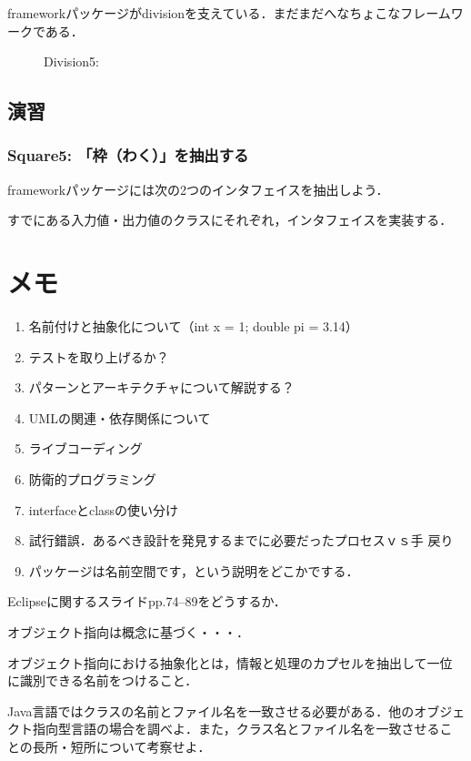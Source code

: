 \documentclass[a4j, twoside]{jsbook}
\begin{document}
frameworkパッケージがdivisionを支えている．まだまだへなちょこなフレームワークである．

\begin{figure}
 
 \caption{Division5: }
\end{figure}

\section{演習}
\subsection{Square5: 「枠（わく）」を抽出する}

frameworkパッケージには次の2つのインタフェイスを抽出しよう．




すでにある入力値・出力値のクラスにそれぞれ，インタフェイスを実装する．




\newpage

\newpage


\chapter{メモ}

\begin{enumerate}
 \item 名前付けと抽象化について（int x = 1; double pi = 3.14）
 \item テストを取り上げるか？
 \item パターンとアーキテクチャについて解説する？
 \item UMLの関連・依存関係について
 \item ライブコーディング
 \item 防衛的プログラミング
 \item interfaceとclassの使い分け
 \item 試行錯誤．あるべき設計を発見するまでに必要だったプロセスｖｓ手
       戻り
 \item パッケージは名前空間です，という説明をどこかでする．
\end{enumerate}

Eclipseに関するスライドpp.74--89をどうするか．

オブジェクト指向は概念に基づく・・・．

オブジェクト指向における抽象化とは，情報と処理のカプセルを抽出して一位
に識別できる名前をつけること．

\begin{演習}
 Java言語ではクラスの名前とファイル名を一致させる必要がある．他のオブジェ
 クト指向型言語の場合を調べよ．また，クラス名とファイル名を一致させるこ
 との長所・短所について考察せよ．
\end{演習}
\end{document}
